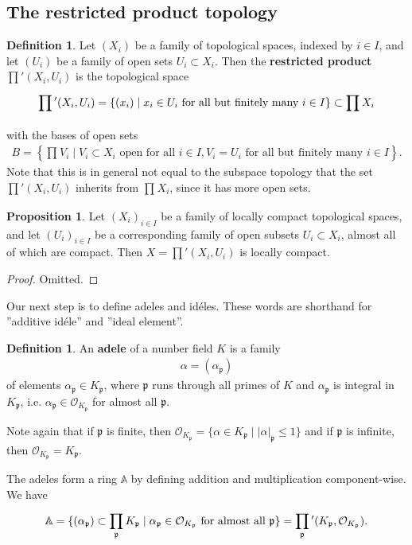 \documentclass{article}
\theoremstyle{definition}
\newtheorem{prop}[theorem]{Proposition}
\newtheorem{defn}[theorem]{Definition}
\begin{document}
\subsection{The restricted product topology}
\begin{defn}\label{defn4.1}
    Let $(X_i)$ be a family of topological spaces, indexed by $i \in I$, and let $(U_i)$ be a family of open sets $U_i \subset X_i$. Then the \textbf{restricted product} $\prod' (X_i,U_i)$ is the topological space
    \begin{align*}
        \prod \hspace{0mm} ' (X_i,U_i) = \{(x_i) \mid x_i \in U_i \text{ for all but finitely many }i \in I\} \subset \prod_{}^{} X_i
    \end{align*}
    with the bases of open sets
    \begin{align*}
        B = \left\{\prod_{}^{} V_i \mid V_i \subset X_i \text{ open for all }i \in I, V_i = U_i \text{ for all but finitely many }i \in I \right\}.
    \end{align*}
    Note that this is in general not equal to the subspace topology that the set $\prod' (X_i,U_i)$ inherits from $\prod_{}^{} X_i$, since it has more open sets.
\end{defn}
\begin{prop}\label{prop4.2}
    Let $(X_i)_{i \in I}$ be a family of locally compact topological spaces, and let $(U_i)_{i \in I}$ be a corresponding family of open subsets $U_i \subset X_i$, almost all of which are compact. Then $X=\prod' (X_i,U_i)$ is locally compact.
\end{prop}
\begin{proof}
    Omitted.
\end{proof}
Our next step is to define adeles and id\'eles. These words are shorthand for ''additive id\'ele'' and ''ideal element''.
\begin{defn}\label{defn4.3}
    An \textbf{adele} of a number field $K$ is a family 
    \begin{align*}
        \alpha = (\alpha_{\mathfrak{p}})
    \end{align*}
    of elements $\alpha_{\mathfrak{p}} \in K_{\mathfrak{p}}$, where $\mathfrak{p}$ runs through all primes of $K$ and $\alpha_{\mathfrak{p}}$ is integral in $K_{\mathfrak{p}}$, i.e. $\alpha_{\mathfrak{p}} \in \mathcal{O}_{K_{\mathfrak{p}}}$ for almost all $\mathfrak{p}$.
\end{defn}
Note again that if $\mathfrak{p}$ is finite, then $\mathcal{O}_{K_{\mathfrak{p}}} = \{\alpha \in K_{\mathfrak{p}} \mid \left|\alpha\right|_{\mathfrak{p}}\le 1\}$ and if $\mathfrak{p}$ is infinite, then $\mathcal{O}_{K_{\mathfrak{p}}} = K_{\mathfrak{p}}$.
\vspace{1mm}
 
The adeles form a ring $\mathbb{A}$ by defining addition and multiplication component-wise. We have 
\begin{align*}
    \mathbb{A} = \{(\alpha_\mathfrak{p}) \subset \prod_{\mathfrak{p}}^{} K_{\mathfrak{p}} \mid \alpha_{\mathfrak{p}} \in \mathcal{O}_{K_{\mathfrak{p}}} \text{ for almost all }\mathfrak{p}\} = \prod_{\mathfrak{p}}^{} \hspace{0mm}' (K_{\mathfrak{p}},\mathcal{O}_{K_{\mathfrak{p}}}).
\end{align*}
\end{document}
